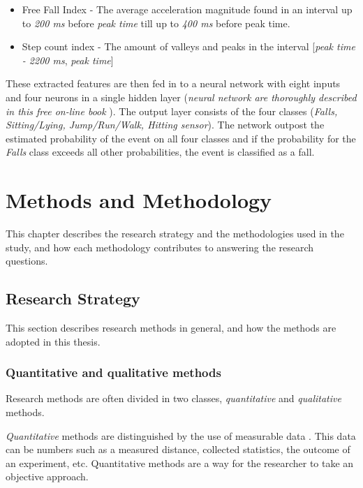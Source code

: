 \documentclass[12pt, a4paper, onecolumn]{article}
\begin{document}
\begin{itemize}
		\item{Free Fall Index} - The average acceleration magnitude found in an interval up to \textit{200 ms} before \textit{peak time} till up to \textit{400 ms} before peak time.
		
		\item{Step count index} - The amount of valleys and peaks in the interval [\textit{peak time - 2200 ms}, \textit{peak time}]
	\end{itemize}
	
	These extracted features are then fed in to a neural network with eight inputs and four neurons in a single hidden layer (\textit{neural network are thoroughly described in this free on-line book}  \cite{neural_networks}). The output layer consists of the four classes (\textit{Falls, Sitting/Lying, Jump/Run/Walk, Hitting sensor}). The network outpost the estimated probability of the event on all four classes and if the probability for the \textit{Falls}  class exceeds all other probabilities, the event is classified as a fall.
	
	
	\newpage
	\section{Methods and Methodology}
	
	This chapter describes the research strategy and the methodologies used in the study, and how each methodology contributes to answering the research questions.
	
	\subsection{Research Strategy}
	
	This section describes research methods in general, and how the methods are adopted in this thesis.
	
	\subsubsection{Quantitative and qualitative methods}
	
	Research methods are often divided in two classes, \textit{quantitative} and \textit{qualitative} methods.
	
	\textit{Quantitative} methods are distinguished by the use of measurable data \cite[p~54]{borrego}. This data can be numbers such as a measured distance, collected statistics, the outcome of an experiment, etc. Quantitative methods are a way for the researcher to take an objective approach.
	
\end{document}
